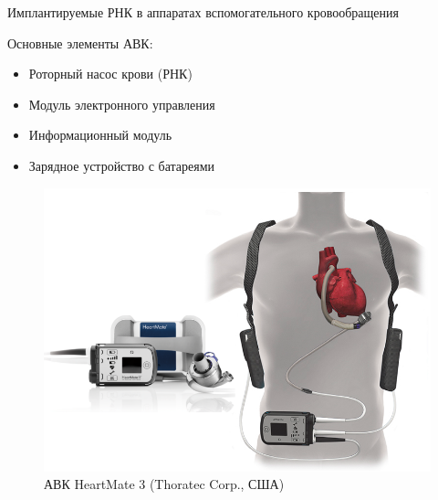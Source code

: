 \documentclass[a4paper, 9pt]{beamer}
\begin{document}

\begin{frame}{Имплантируемые РНК в аппаратах вспомогательного кровообращения}

\begin{minipage}[ht]{0.52\textwidth}
\footnotesize%

Основные элементы АВК:
\begin{itemize}
 \item \alert{Роторный насос крови (РНК)}
 \item Модуль электронного управления
 \item Информационный модуль
 \item Зарядное устройство с батареями
\end{itemize}
\end{minipage}
\hfill
\begin{minipage}[ht]{0.47\textwidth}
\begin{figure}
 \includegraphics[scale=0.165]{../images/hm_3_pres}
 \caption*{\footnotesize АВК HeartMate 3 (Thoratec Corp., США)} 
\end{figure}
\end{minipage}
\vfill
\begin{minipage}[ht]{.28\textwidth}
\centering


\end{minipage}
\end{frame}
\end{document}
